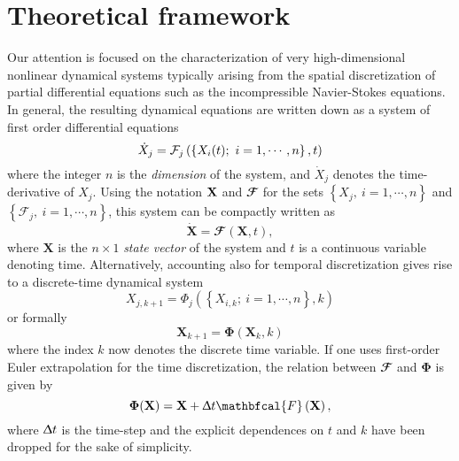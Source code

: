 \section{Theoretical framework}
\label{sec: theory}

  Our attention is focused on the characterization of very high-dimensional nonlinear dynamical systems typically arising from the spatial discretization of partial differential equations such as the incompressible Navier-Stokes equations. In general, the resulting dynamical equations are written down as a system of first order differential equations
  \begin{equation}
    \dot{X}_j = \mathcal{F}_j \left( \left\{ X_i(t);\ i =1, \cdots, n \right\}, t \right)
    \notag
  \end{equation}
  where the integer $n$ is the \emph{dimension} of the system, and $\dot{X}_j$ denotes the time-derivative of $X_j$. Using the notation $\bf{X}$ and $\mathbfcal{F}$ for the sets $\left\{ X_j,\ i =1, \cdots, n \right\}$ and $\left\{ \mathcal{F}_j,\ i =1, \cdots, n \right\}$, this system can be compactly written as
  \begin{equation}
    \dot{\mathbf{X}} = \mathbfcal{F}(\mathbf{X}, t),
    \label{eq: theory -- continuous-time dynamical system}
  \end{equation}
  where $\mathbf{X}$ is the $n \times 1$ \emph{state vector} of the system and $t$ is a continuous variable denoting time. Alternatively, accounting also for temporal discretization gives rise to a discrete-time dynamical system
  \begin{equation}
    X_{j, k+1} = \Phi_j \left( \left\{ X_{i, k};\ i = 1, \cdots, n \right\}, k \right)
  \end{equation}
  or formally
  \begin{equation}
    \mathbf{X}_{k+1} = \bm{\Phi}(\mathbf{X}_k, k)
    \label{eq: theory -- discrete-time dynamical system}
  \end{equation}
  where the index $k$ now denotes the discrete time variable. If one uses first-order Euler extrapolation for the time discretization, the relation between $\mathbfcal{F}$ and $\bm{\Phi}$ is given by
  \begin{equation}
    \bm{\Phi}(\mathbf{X}) = \mathbf{X} + \Updelta t \mathbfcal{F}\left( \mathbf{X} \right),
    \notag
  \end{equation}
  where $\Updelta t$ is the time-step and the explicit dependences on $t$ and $k$ have been dropped for the sake of simplicity.

